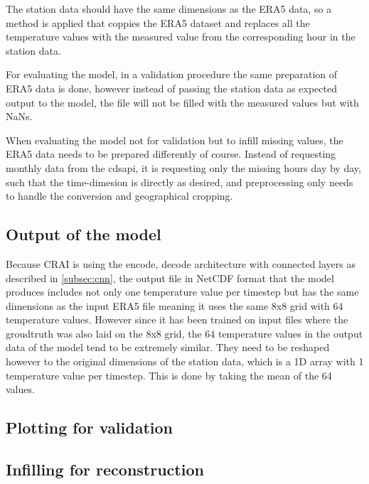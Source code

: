 The station data should have the same dimensions as the ERA5 data, so a method is applied that coppies the ERA5 dataset and replaces all the temperature values with the measured value from the corresponding hour in the station data.

For evaluating the model, in a validation procedure the same preparation of ERA5 data is done, however instead of passing the station data as expected output to the model, the file will not be filled with the measured values but with NaNs.

When evaluating the model not for validation but to infill missing values, the ERA5 data needs to be prepared differently of course. Instead of requesting monthly data from the cdsapi, it is requesting only the missing hours day by day, such that the time-dimesion is directly as desired, and preprocessing only needs to handle the conversion and geographical cropping.

\subsection{Output of the model}

Because CRAI is using the encode, decode architecture with connected layers as described in \autoref{subsec:cnn}, the output file in NetCDF format that the model produces includes not only one temperature value per timestep but has the same dimensions as the input ERA5 file meaning it uses the same 8x8 grid with 64 temperature values. However since it has been trained on input files where the groudtruth was also laid on the 8x8 grid, the 64 temperature values in the output data of the model tend to be extremely similar. They need to be reshaped however to the original dimensions of the station data, which is a 1D array with 1 temperature value per timestep. This is done by taking the mean of the 64 values. 

\subsection{Plotting for validation}




\subsection{Infilling for reconstruction}

